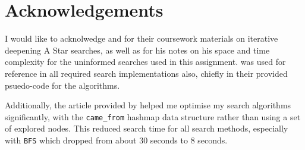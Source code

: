 \section{Acknowledgements}
\label{sec:Acknowledgements}

I would like to acknolwedge \citet{rbruce1998} and \citet{amackworth1998} for
their coursework materials on iterative deepening A Star searches, as well as
\citet{canderson2012} for his notes on his space and time complexity for
the uninformed searches used in this assignment. \citet{aima2009} was used for
reference in all required search implementations also, chiefly in their provided
psuedo-code for the algorithms.

Additionally, the article provided by \citet{redblob2014} helped me optimise
my search algorithms significantly, with the \texttt{came\_from} hashmap data
structure rather than using a set of explored nodes. This reduced search time
for all search methods, especially with \texttt{BFS} which dropped from about 30
seconds to 8 seconds.
